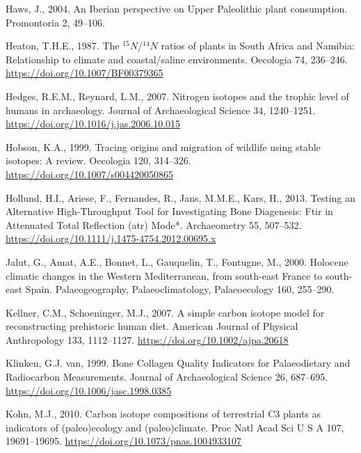 \documentclass[3p]{elsarticle} %
\newlength{\cslhangindent}
\newlength{\cslentryspacingunit} %
\newenvironment{CSLReferences}[2] %
 {%
  \setlength{\parindent}{0pt}
  \ifodd #1
  \let\oldpar\par
  \def\par{\hangindent=\cslhangindent\oldpar}
  \fi
  \setlength{\parskip}{#2\cslentryspacingunit}
 }%
 {}
\begin{document}
\begin{CSLReferences}{1}{0}
\leavevmode{}%
Haws, J., 2004. An {Iberian} perspective on {Upper Paleolithic} plant consumption. Promontoria 2, 49--106.

\leavevmode{}%
Heaton, T.H.E., 1987. The \(^{15}N\)/\(^{14}N\) ratios of plants in {South Africa} and {Namibia}: Relationship to climate and coastal/saline environments. Oecologia 74, 236--246. \url{https://doi.org/10.1007/BF00379365}

\leavevmode{}%
Hedges, R.E.M., Reynard, L.M., 2007. Nitrogen isotopes and the trophic level of humans in archaeology. Journal of Archaeological Science 34, 1240--1251. \url{https://doi.org/10.1016/j.jas.2006.10.015}

\leavevmode{}%
Hobson, K.A., 1999. Tracing origins and migration of wildlife using stable isotopes: A review. Oecologia 120, 314--326. \url{https://doi.org/10.1007/s004420050865}

\leavevmode{}%
Hollund, H.I., Ariese, F., Fernandes, R., Jans, M.M.E., Kars, H., 2013. Testing an {Alternative High}-{Throughput Tool} for {Investigating Bone Diagenesis}: {Ftir} in {Attenuated Total Reflection} (atr) {Mode}*. Archaeometry 55, 507--532. \url{https://doi.org/10.1111/j.1475-4754.2012.00695.x}

\leavevmode{}%
Jalut, G., Amat, A.E., Bonnet, L., Gauquelin, T., Fontugne, M., 2000. Holocene climatic changes in the {Western Mediterranean}, from south-east {France} to south-east {Spain}. Palaeogeography, Palaeoclimatology, Palaeoecology 160, 255--290.

\leavevmode{}%
Kellner, C.M., Schoeninger, M.J., 2007. A simple carbon isotope model for reconstructing prehistoric human diet. American Journal of Physical Anthropology 133, 1112--1127. \url{https://doi.org/10.1002/ajpa.20618}

\leavevmode{}%
Klinken, G.J. van, 1999. Bone {Collagen Quality Indicators} for {Palaeodietary} and {Radiocarbon Measurements}. Journal of Archaeological Science 26, 687--695. \url{https://doi.org/10.1006/jasc.1998.0385}

\leavevmode{}%
Kohn, M.J., 2010. Carbon isotope compositions of terrestrial {C3} plants as indicators of (paleo)ecology and (paleo)climate. Proc Natl Acad Sci U S A 107, 19691--19695. \url{https://doi.org/10.1073/pnas.1004933107}


\end{CSLReferences}
\end{document}
